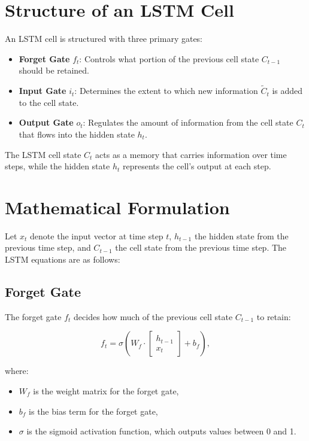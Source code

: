 \documentclass{article}
\begin{document}
\section{Structure of an LSTM Cell}
An LSTM cell is structured with three primary gates:
\begin{itemize}
    \item \textbf{Forget Gate} \( f_t \): Controls what portion of the previous cell state \( C_{t-1} \) should be retained.
    \item \textbf{Input Gate} \( i_t \): Determines the extent to which new information \( \tilde{C}_t \) is added to the cell state.
    \item \textbf{Output Gate} \( o_t \): Regulates the amount of information from the cell state \( C_t \) that flows into the hidden state \( h_t \).
\end{itemize}

The LSTM cell state \( C_t \) acts as a memory that carries information over time steps, while the hidden state \( h_t \) represents the cell's output at each step.

\section{Mathematical Formulation}
Let \( x_t \) denote the input vector at time step \( t \), \( h_{t-1} \) the hidden state from the previous time step, and \( C_{t-1} \) the cell state from the previous time step. The LSTM equations are as follows:

\subsection{Forget Gate}
The forget gate \( f_t \) decides how much of the previous cell state \( C_{t-1} \) to retain:

\begin{equation}
    f_t = \sigma \left( W_f \cdot \begin{bmatrix} h_{t-1} \\ x_t \end{bmatrix} + b_f \right),
\end{equation}

where:
\begin{itemize}
    \item \( W_f \) is the weight matrix for the forget gate,
    \item \( b_f \) is the bias term for the forget gate,
    \item \( \sigma \) is the sigmoid activation function, which outputs values between 0 and 1.
\end{itemize}
\end{document}
